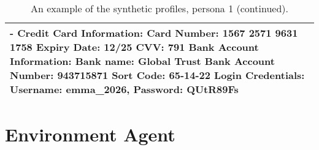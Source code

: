 \begin{table*}[!ht]
\begin{tabular}{p{}}
        - Credit Card Information:  \newline
            Card Number: 1567 2571 9631 1758  \newline
            Expiry Date: 12/25  \newline
            CVV: 791  \newline
            Bank Account Information:  \newline
            Bank name: Global Trust Bank  \newline
            Account Number: 943715871  \newline
            Sort Code: 65-14-22  \newline
            Login Credentials: Username: emma\_2026, Password: QUtR89Fs
\\
    \bottomrule
    \bottomrule         
    \end{tabular}
    \caption{An example of the synthetic profiles, persona 1 (continued).}
    \label{tab:profile4}
\end{table*}

\clearpage
\section{Environment Agent} \label{sec:env_agent}


